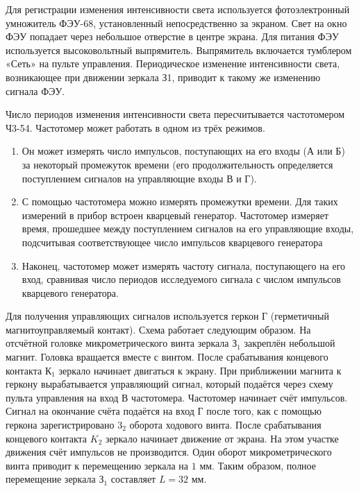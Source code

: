 \documentclass[15pt,a5paper,reqno]{article}
\begin{document}
Для регистрации изменения интенсивности света используется фотоэлектронный умножитель ФЭУ-68, установленный непосредственно
за экраном. Свет на окно ФЭУ попадает через небольшое отверстие в
центре экрана. Для питания ФЭУ используется высоковольтный выпрямитель. Выпрямитель включается тумблером «Сеть» на пульте управления.
Периодическое изменение интенсивности света, возникающее при
движении зеркала З1, приводит к такому же изменению сигнала ФЭУ.

Число периодов изменения интенсивности света пересчитывается частотомером Ч3-54. Частотомер может работать в одном из трёх режимов.

\begin{enumerate}
    \item Он может измерять число импульсов, поступающих на его входы
    (А или Б) за некоторый промежуток времени (его продолжительность
    определяется поступлением сигналов на управляющие входы В и Г).

    \item С помощью частотомера можно измерять промежутки времени.
    Для таких измерений в прибор встроен кварцевый генератор. Частотомер измеряет время, прошедшее между поступлением сигналов на его
    управляющие входы, подсчитывая соответствующее число импульсов кварцевого генератора
    
    \item Наконец, частотомер может измерять частоту сигнала, поступающего на его вход, сравнивая число периодов исследуемого сигнала с
    числом импульсов кварцевого генератора.
\end{enumerate}


Для получения управляющих сигналов используется геркон $Г$ (герметичный магнитоуправляемый контакт). Схема работает следующим
образом. На отсчётной головке микрометрического винта зеркала $З_1$
закреплён небольшой магнит. Головка вращается вместе с винтом. После срабатывания концевого контакта $К_1$ зеркало начинает двигаться
к экрану. При приближении магнита к геркону вырабатывается управляющий сигнал, который подаётся через схему пульта управления на
вход В частотомера. Частотомер начинает счёт импульсов. Сигнал на
окончание счёта подаётся на вход $Г$ после того, как с помощью геркона зарегистрировано $3_2$ оборота ходового винта. После срабатывания
концевого контакта $K_2$ зеркало начинает движение от экрана. На этом
участке движения счёт импульсов не производится. Один оборот микрометрического винта приводит к перемещению зеркала на $1$ мм. Таким
образом, полное перемещение зеркала $З_1$ составляет $L = 32 \text{  мм}$.
\end{document}
